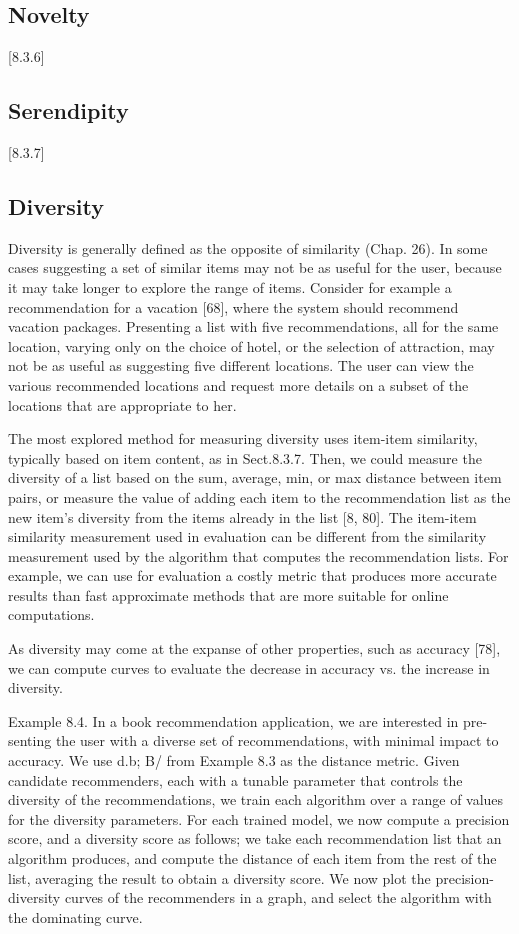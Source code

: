 \subsection{Novelty}
[8.3.6]

\subsection{Serendipity}
[8.3.7]

\subsection{Diversity}

Diversity is generally defined as the opposite of similarity (Chap. 26). In some cases suggesting a set of similar items may not be as useful for the user, because it may take longer to explore the range of items. Consider for example a recommendation for a vacation [68], where the system should recommend vacation packages. Presenting a list with five recommendations, all for the same location, varying only on the choice of hotel, or the selection of attraction, may not be as useful as suggesting five different locations. The user can view the various recommended locations and request more details on a subset of the locations that are appropriate to her.

The most explored method for measuring diversity uses item-item similarity, typically based on item content, as in Sect.8.3.7. Then, we could measure the diversity of a list based on the sum, average, min, or max distance between item pairs, or measure the value of adding each item to the recommendation list as the new item’s diversity from the items already in the list [8, 80]. The item-item similarity measurement used in evaluation can be different from the similarity measurement used by the algorithm that computes the recommendation lists. For example, we can use for evaluation a costly metric that produces more accurate results than fast approximate methods that are more suitable for online computations.

As diversity may come at the expanse of other properties, such as accuracy [78], we can compute curves to evaluate the decrease in accuracy vs. the increase in diversity.

Example 8.4. In a book recommendation application, we are interested in pre- senting the user with a diverse set of recommendations, with minimal impact to accuracy. We use d.b; B/ from Example 8.3 as the distance metric. Given candidate recommenders, each with a tunable parameter that controls the diversity of the recommendations, we train each algorithm over a range of values for the diversity parameters. For each trained model, we now compute a precision score, and a diversity score as follows; we take each recommendation list that an algorithm produces, and compute the distance of each item from the rest of the list, averaging the result to obtain a diversity score. We now plot the precision-diversity curves of the recommenders in a graph, and select the algorithm with the dominating curve.

